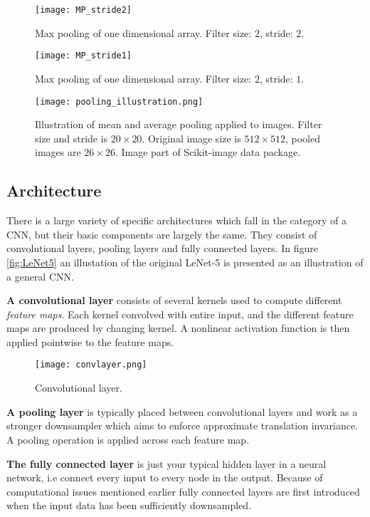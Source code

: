 \documentclass[../../thesis.tex]{subfiles}
\begin{document}
\begin{figure}[h]
    \label{fig:mp2}
    \texttt{[image: MP\_stride2]}
    \centering    
    \caption{Max pooling of one dimensional array. Filter size: $2$, stride: $2$.}
\end{figure}
\begin{figure}[h]
    \label{fig:mp1}
    \texttt{[image: MP\_stride1]}
    \centering    
    \caption{Max pooling of one dimensional array. Filter size: $2$, stride: $1$.}
\end{figure}

\begin{figure}[h]
    \label{fig:mean_max_pool}
    \centering
    \texttt{[image: pooling\_illustration.png]}
    \caption{Illustration of mean and average pooling applied to images. Filter size and stride is $20\times 20$. Original image size is $512\times 512$, pooled images are $26\times26$. Image part of Scikit-image data package.}
\end{figure}


\subsection{Architecture}
There is a large variety of specific architectures which fall in the category of a CNN, but their basic components are largely the same. They consist of convolutional layers, pooling layers and fully connected layers. In figure \ref{fig:LeNet5} an illustation of the original LeNet-5 \cite{LeCun1989ConvNet} is presented as an illustration of a general CNN.\newline

\textbf{A convolutional layer} consists of several kernels used to compute different \textit{feature maps}. Each kernel convolved with entire input, and the different feature maps are produced by changing kernel. A nonlinear activation function is then applied pointwise to the feature maps.
\begin{figure}[h]
    \centering
    \texttt{[image: convlayer.png]}
    \caption{Convolutional layer.}
\end{figure}
\textbf{A pooling layer} is typically placed between convolutional layers and work as a stronger downsampler which aims to enforce approximate translation invariance. A pooling operation is applied across each feature map.\newline

\textbf{The fully connected layer} is just your typical hidden layer in a neural network, i.e connect every input to every node in the output. Because of computational issues mentioned earlier fully connected layers are first introduced when the input data has been sufficiently downsampled.
\end{document}
